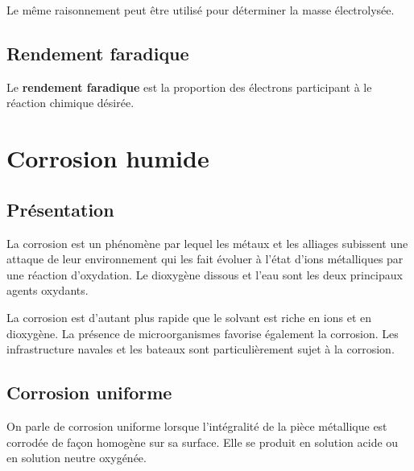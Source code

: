 Le même raisonnement peut être utilisé pour déterminer la masse électrolysée.


\subsection{Rendement faradique}
Le \textbf{rendement faradique} est la proportion des électrons participant à le réaction chimique désirée.






\section{Corrosion humide}
\subsection{Présentation}
La corrosion est un phénomène par lequel les métaux et les alliages subissent une attaque de leur environnement qui les fait évoluer à l'état d'ions métalliques par une réaction d'oxydation. Le dioxygène dissous et l'eau sont les deux principaux agents oxydants.

La corrosion est d'autant plus rapide que le solvant est riche en ions et en dioxygène. La présence de microorganismes favorise également la corrosion. Les infrastructure navales et les bateaux sont particulièrement sujet à la corrosion.

\subsection{Corrosion uniforme}
On parle de corrosion uniforme lorsque l'intégralité de la pièce métallique est corrodée de façon homogène sur sa surface. Elle se produit en solution acide ou en solution neutre oxygénée.

